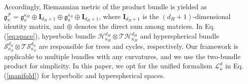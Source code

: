 Accordingly,  Riemannian metric of the product bundle is yielded as 
$\mathfrak{g}^{\mathcal P}_x=\mathfrak{g}^{\kappa_H}_x \oplus \mathbf I_{d_H+1}\oplus  \mathfrak{g}^{\kappa_S}_x \oplus  \mathbf I_{d_H+1}$, 
where $\mathbf I_{d_H+1}$ is the $(d_H+1)$-dimensional identity matrix, 
and  $\oplus$ denotes the direct sum among matrices.
In Eq. (\ref{eq:space}), hyperbolic bundle $\mathcal H^{d_H}_{\kappa_H} \otimes \mathcal T\mathcal H^{d_H}_{\kappa_H}$  and hyperspherical bundle $\mathcal S^{d_S}_{\kappa_S} \otimes \mathcal T\mathcal S^{d_S}_{\kappa_S}$ are responsible for trees and cycles, respectively. 
Our framework is applicable to multiple bundles with any curvatures, and we use the two-bundle product for simplicity.
In this paper, we opt for the unified formalism $\mathcal L^d_\kappa$ in Eq. (\ref{manifold}) for hyperbolic and hyperspherical spaces.


